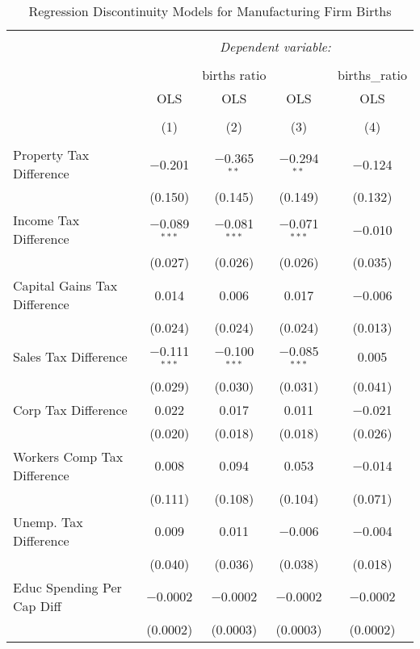
\begin{table}[!htbp] \centering 
  \caption{Regression Discontinuity Models for  Manufacturing Firm Births} 
  \label{31-33rd} 
\begin{tabular}{@{\extracolsep{5pt}}lcccc} 
\\[-1.8ex]\hline 
\hline \\[-1.8ex] 
 & \multicolumn{4}{c}{\textit{Dependent variable:}} \\ 
\cline{2-5} 
\\[-1.8ex] & \multicolumn{3}{c}{births ratio} & births\_ratio \\ 
 & OLS & OLS & OLS & OLS \\ 
\\[-1.8ex] & (1) & (2) & (3) & (4)\\ 
\hline \\[-1.8ex] 
 Property Tax Difference & $-$0.201 & $-$0.365$^{**}$ & $-$0.294$^{**}$ & $-$0.124 \\ 
  & (0.150) & (0.145) & (0.149) & (0.132) \\ 
  Income Tax Difference & $-$0.089$^{***}$ & $-$0.081$^{***}$ & $-$0.071$^{***}$ & $-$0.010 \\ 
  & (0.027) & (0.026) & (0.026) & (0.035) \\ 
  Capital Gains Tax Difference & 0.014 & 0.006 & 0.017 & $-$0.006 \\ 
  & (0.024) & (0.024) & (0.024) & (0.013) \\ 
  Sales Tax Difference & $-$0.111$^{***}$ & $-$0.100$^{***}$ & $-$0.085$^{***}$ & 0.005 \\ 
  & (0.029) & (0.030) & (0.031) & (0.041) \\ 
  Corp Tax Difference & 0.022 & 0.017 & 0.011 & $-$0.021 \\ 
  & (0.020) & (0.018) & (0.018) & (0.026) \\ 
  Workers Comp Tax Difference & 0.008 & 0.094 & 0.053 & $-$0.014 \\ 
  & (0.111) & (0.108) & (0.104) & (0.071) \\ 
  Unemp. Tax Difference & 0.009 & 0.011 & $-$0.006 & $-$0.004 \\ 
  & (0.040) & (0.036) & (0.038) & (0.018) \\ 
  Educ Spending Per Cap Diff & $-$0.0002 & $-$0.0002 & $-$0.0002 & $-$0.0002 \\ 
  & (0.0002) & (0.0003) & (0.0003) & (0.0002) \\ 

\end{tabular}
\end{table}
